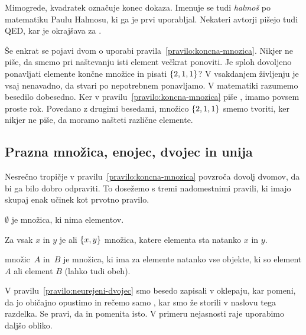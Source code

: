 Mimogrede, kvadratek označuje konec dokaza. Imenuje se tudi \emph{halmoš} po matematiku
Paulu Halmosu, ki ga je prvi uporabljal. Nekateri avtorji pišejo tudi QED, kar je okrajšava za .

Še enkrat se pojavi dvom o uporabi pravila~\ref{pravilo:koncna-mnozica}. Nikjer ne piše, da smemo pri naštevanju isti element večkrat ponoviti. Je sploh dovoljeno ponavljati elemente končne množice in pisati $\left\{2, 1, 1\right\}$?
%
V vsakdanjem življenju je vsaj nenavadno, da stvari po nepotrebnem ponavljamo.
%
V matematiki razumemo besedilo dobesedno. Ker v pravilu~\ref{pravilo:koncna-mnozica} piše , imamo povsem proste rok. Povedano z drugimi besedami, množico
$\left\{2, 1, 1\right\}$ smemo tvoriti, ker nikjer ne piše, da moramo našteti različne elemente.

\subsection{Prazna množica, enojec, dvojec in unija}
\label{sec:prazna-dvojec-unija}

Nesrečno tropičje v pravilu~\ref{pravilo:koncna-mnozica} povzroča dovolj dvomov, da bi ga bilo dobro odpraviti.
To dosežemo s tremi nadomestnimi pravili, ki imajo skupaj enak učinek kot prvotno pravilo.

\begin{pravilo}
  \label{pravilo:prazna-mnozica}
   $\emptyset$ je množica, ki nima elementov.
\end{pravilo}

\begin{pravilo}
  \label{pravilo:neurejeni-dvojec}
  Za vsak $x$ in $y$ je  ali  $\left\{x, y\right\}$ množica, katere
  elementa sta natanko $x$ in $y$.
\end{pravilo}

\begin{pravilo}
  \label{pravilo:unija}
   množic~$A$ in~$B$ je množica, ki ima za elemente
  natanko vse objekte, ki so element $A$ ali element $B$ (lahko tudi obeh).
\end{pravilo}

V pravilu~\ref{pravilo:neurejeni-dvojec} smo besedo  zapisali v oklepaju, kar
pomeni, da jo običajno opustimo in rečemo samo , kar smo že storili v naslovu tega razdelka. Se pravi, da  in  pomenita isto. V primeru nejasnosti raje uporabimo daljšo obliko.

